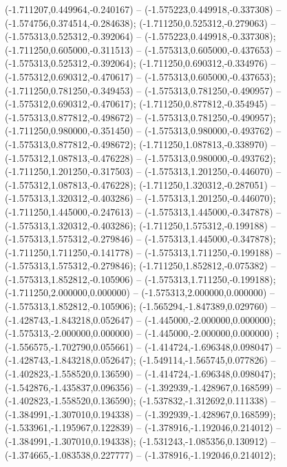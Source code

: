 (-1.711207,0.449964,-0.240167) -- (-1.575223,0.449918,-0.337308) -- (-1.574756,0.374514,-0.284638);
 (-1.711250,0.525312,-0.279063) -- (-1.575313,0.525312,-0.392064) -- (-1.575223,0.449918,-0.337308);
 (-1.711250,0.605000,-0.311513) -- (-1.575313,0.605000,-0.437653) -- (-1.575313,0.525312,-0.392064);
 (-1.711250,0.690312,-0.334976) -- (-1.575312,0.690312,-0.470617) -- (-1.575313,0.605000,-0.437653);
 (-1.711250,0.781250,-0.349453) -- (-1.575313,0.781250,-0.490957) -- (-1.575312,0.690312,-0.470617);
 (-1.711250,0.877812,-0.354945) -- (-1.575313,0.877812,-0.498672) -- (-1.575313,0.781250,-0.490957);
 (-1.711250,0.980000,-0.351450) -- (-1.575313,0.980000,-0.493762) -- (-1.575313,0.877812,-0.498672);
 (-1.711250,1.087813,-0.338970) -- (-1.575312,1.087813,-0.476228) -- (-1.575313,0.980000,-0.493762);
 (-1.711250,1.201250,-0.317503) -- (-1.575313,1.201250,-0.446070) -- (-1.575312,1.087813,-0.476228);
 (-1.711250,1.320312,-0.287051) -- (-1.575313,1.320312,-0.403286) -- (-1.575313,1.201250,-0.446070);
 (-1.711250,1.445000,-0.247613) -- (-1.575313,1.445000,-0.347878) -- (-1.575313,1.320312,-0.403286);
 (-1.711250,1.575312,-0.199188) -- (-1.575313,1.575312,-0.279846) -- (-1.575313,1.445000,-0.347878);
 (-1.711250,1.711250,-0.141778) -- (-1.575313,1.711250,-0.199188) -- (-1.575313,1.575312,-0.279846);
 (-1.711250,1.852812,-0.075382) -- (-1.575313,1.852812,-0.105906) -- (-1.575313,1.711250,-0.199188);
 (-1.711250,2.000000,0.000000) -- (-1.575313,2.000000,0.000000) -- (-1.575313,1.852812,-0.105906);
 (-1.565294,-1.847389,0.029760) -- (-1.428743,-1.843218,0.052647) -- (-1.445000,-2.000000,0.000000);
 (-1.575313,-2.000000,0.000000) -- (-1.445000,-2.000000,0.000000) ;
 (-1.556575,-1.702790,0.055661) -- (-1.414724,-1.696348,0.098047) -- (-1.428743,-1.843218,0.052647);
 (-1.549114,-1.565745,0.077826) -- (-1.402823,-1.558520,0.136590) -- (-1.414724,-1.696348,0.098047);
 (-1.542876,-1.435837,0.096356) -- (-1.392939,-1.428967,0.168599) -- (-1.402823,-1.558520,0.136590);
 (-1.537832,-1.312692,0.111338) -- (-1.384991,-1.307010,0.194338) -- (-1.392939,-1.428967,0.168599);
 (-1.533961,-1.195967,0.122839) -- (-1.378916,-1.192046,0.214012) -- (-1.384991,-1.307010,0.194338);
 (-1.531243,-1.085356,0.130912) -- (-1.374665,-1.083538,0.227777) -- (-1.378916,-1.192046,0.214012);
